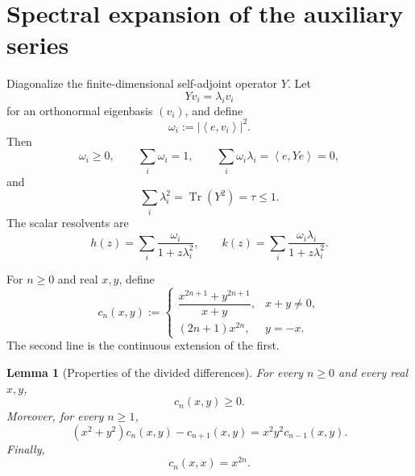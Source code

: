 \documentclass[11pt]{article}
\newtheorem{lemma}[theorem]{Lemma}
\newcommand{\ip}[2]{\left\langle #1,#2\right\rangle}
\newcommand{\Tr}{\operatorname{Tr}}
\begin{document}
\section{Spectral expansion of the auxiliary series}

Diagonalize the finite-dimensional self-adjoint operator $Y$.  Let
\[
   Yv_i=\lambda_i v_i
\]
for an orthonormal eigenbasis $(v_i)$, and define
\begin{equation}
   \omega_i:=|\ip{e}{v_i}|^2.
   \label{eq:omega}
\end{equation}
Then
\begin{equation}
   \omega_i\ge0,
   \qquad
   \sum_i\omega_i=1,
   \qquad
   \sum_i\omega_i\lambda_i=\ip{e}{Ye}=0,
   \label{eq:omega-identities}
\end{equation}
and
\begin{equation}
   \sum_i\lambda_i^2=\Tr(Y^2)=\tau\le1.
   \label{eq:spectrum-bound}
\end{equation}
The scalar resolvents are
\begin{equation}
   h(z)=\sum_i\frac{\omega_i}{1+z\lambda_i^2},
   \qquad
   k(z)=\sum_i\frac{\omega_i\lambda_i}{1+z\lambda_i^2}.
   \label{eq:h-k-spectral}
\end{equation}

For $n\ge0$ and real $x,y$, define
\begin{equation}
   c_n(x,y)
   :=
   \begin{cases}
   \dfrac{x^{2n+1}+y^{2n+1}}{x+y},&x+y\ne0,\\[2mm]
   (2n+1)x^{2n},&y=-x.
   \end{cases}
   \label{eq:def-cn}
\end{equation}
The second line is the continuous extension of the first.

\begin{lemma}[Properties of the divided differences]\label{lem:cn}
For every $n\ge0$ and every real $x,y$,
\begin{equation}
   c_n(x,y)\ge0.
   \label{eq:cn-positive}
\end{equation}
Moreover, for every $n\ge1$,
\begin{equation}
   (x^2+y^2)c_n(x,y)-c_{n+1}(x,y)
   =x^2y^2c_{n-1}(x,y).
   \label{eq:cn-recurrence}
\end{equation}
Finally,
\begin{equation}
   c_n(x,x)=x^{2n}.
   \label{eq:cn-diagonal}
\end{equation}
\end{lemma}
\end{document}
